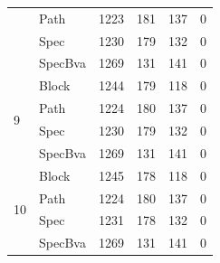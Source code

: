\begin{tabular}{llrrrr}
 & Path & 1223 & 181 & 137 & 0 \\
 & Spec & 1230 & 179 & 132 & 0 \\
 & SpecBva & 1269 & 131 & 141 & 0 \\
\cline{1-6}
\multirow[t]{4}{*}{9} & Block & 1244 & 179 & 118 & 0 \\
 & Path & 1224 & 180 & 137 & 0 \\
 & Spec & 1230 & 179 & 132 & 0 \\
 & SpecBva & 1269 & 131 & 141 & 0 \\
\cline{1-6}
\multirow[t]{4}{*}{10} & Block & 1245 & 178 & 118 & 0 \\
 & Path & 1224 & 180 & 137 & 0 \\
 & Spec & 1231 & 178 & 132 & 0 \\
 & SpecBva & 1269 & 131 & 141 & 0 \\
\cline{1-6}
\bottomrule
\end{tabular}
